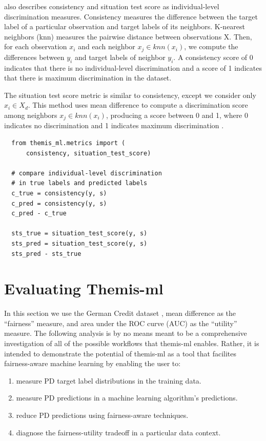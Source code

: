 \documentclass{acm_proc_article-sp}
\begin{document}
\cite{zliobaite2015survey} also describes consistency and situation test score
as individual-level discrimination measures. Consistency measures the difference
between the target label of a particular observation and target labels of its
neighbors. K-nearest neighbors (knn) measures the pairwise distance between
observations X. Then, for each observation \(x_i\) and each neighbor \(x_j \in
knn(x_i)\), we compute the differences between \(y_i\) and target labels of
neighbor \(y_i\). A consistency score of 0 indicates that there is no
individual-level discrimination and a score of 1 indicates that there is maximum
discrimination in the dataset.

The situation test score metric is similar to consistency, except we consider
only \(x_i \in X_d\). This method uses mean difference to compute a
discrimination score among neighbors \(x_j \in knn(x_i)\), producing a score
between 0 and 1, where 0 indicates no discrimination and 1 indicates maximum
discrimination \cite{zliobaite2015survey}.

\begin{verbatim}
  from themis_ml.metrics import (
      consistency, situation_test_score)

  # compare individual-level discrimination
  # in true labels and predicted labels
  c_true = consistency(y, s)
  c_pred = consistency(y, s)
  c_pred - c_true

  sts_true = situation_test_score(y, s)
  sts_pred = situation_test_score(y, s)
  sts_pred - sts_true
\end{verbatim}

\section{Evaluating Themis-ml}

In this section we use the German Credit dataset \cite{bache2013uci}, mean
difference as the ``fairness'' measure, and area under the ROC curve (AUC) as
the ``utility'' measure. The following analysis is by no means meant to be a
comprehensive investigation of all of the possible workflows that themis-ml
enables. Rather, it is intended to demonstrate the potential of themis-ml as a
tool that facilites fairness-aware machine learning by enabling the user to:

\begin{enumerate}
  \item measure PD target label distributions in the training data.
  \item measure PD predictions in a machine learning algorithm's predictions.
  \item reduce PD predictions using fairness-aware techniques.
  \item diagnose the fairness-utility tradeoff in a particular data context.
\end{enumerate}
\end{document}
